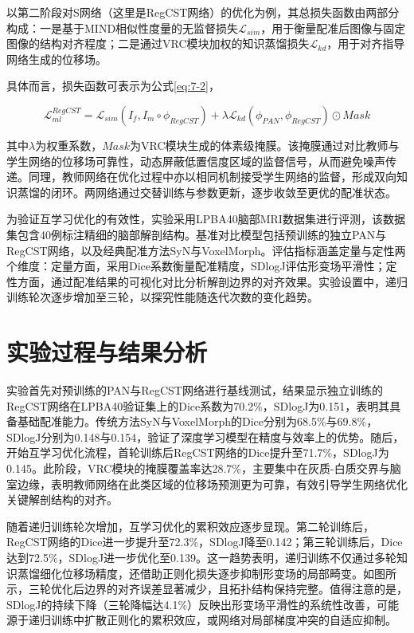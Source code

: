 以第二阶段对S网络（这里是RegCST网络）的优化为例，其总损失函数由两部分构成：一是基于MIND相似性度量的无监督损失$\mathcal{L}_{sim}$，用于衡量配准后图像与固定图像的结构对齐程度；二是通过VRC模块加权的知识蒸馏损失$\mathcal{L}_{kd}$，用于对齐指导网络生成的位移场。

具体而言，损失函数可表示为公式\ref{eq:7-2}，

\begin{equation}
    \mathcal{L}_{ml}^{RegCST}=\mathcal{L}_{sim}(I_f,I_m\circ \phi_{RegCST})+\lambda\mathcal{L}_{kd}(\phi_{PAN},\phi_{RegCST})\odot Mask
    \label{eq:7-2}
\end{equation}

其中$\lambda$为权重系数，$Mask$为VRC模块生成的体素级掩膜。该掩膜通过对比教师与学生网络的位移场可靠性，动态屏蔽低置信度区域的监督信号，从而避免噪声传递。同理，教师网络在优化过程中亦以相同机制接受学生网络的监督，形成双向知识蒸馏的闭环。两网络通过交替训练与参数更新，逐步收敛至更优的配准状态。

为验证互学习优化的有效性，实验采用LPBA40脑部MRI数据集进行评测，该数据集包含40例标注精细的脑部解剖结构。基准对比模型包括预训练的独立PAN与RegCST网络，以及经典配准方法SyN与VoxelMorph。评估指标涵盖定量与定性两个维度：定量方面，采用Dice系数衡量配准精度，SDlogJ评估形变场平滑性；定性方面，通过配准结果的可视化对比分析解剖边界的对齐效果。实验设置中，递归训练轮次逐步增加至三轮，以探究性能随迭代次数的变化趋势。



\section{实验过程与结果分析}

实验首先对预训练的PAN与RegCST网络进行基线测试，结果显示独立训练的RegCST网络在LPBA40验证集上的Dice系数为70.2\%，SDlogJ为0.151，表明其具备基础配准能力。传统方法SyN与VoxelMorph的Dice分别为68.5\%与69.8\%，SDlogJ分别为0.148与0.154，验证了深度学习模型在精度与效率上的优势。随后，开始互学习优化流程，首轮训练后RegCST网络的Dice提升至71.7\%，SDlogJ为0.145。此阶段，VRC模块的掩膜覆盖率达28.7\%，主要集中在灰质-白质交界与脑室边缘，表明教师网络在此类区域的位移场预测更为可靠，有效引导学生网络优化关键解剖结构的对齐。

随着递归训练轮次增加，互学习优化的累积效应逐步显现。第二轮训练后，RegCST网络的Dice进一步提升至72.3\%，SDlogJ降至0.142；第三轮训练后，Dice达到72.5\%，SDlogJ进一步优化至0.139。这一趋势表明，递归训练不仅通过多轮知识蒸馏细化位移场精度，还借助正则化损失逐步抑制形变场的局部畸变。如图所示，三轮优化后边界的对齐误差显著减少，且拓扑结构保持完整。值得注意的是，SDlogJ的持续下降（三轮降幅达4.1\%）反映出形变场平滑性的系统性改善，可能源于递归训练中扩散正则化的累积效应，或网络对局部梯度冲突的自适应抑制。

